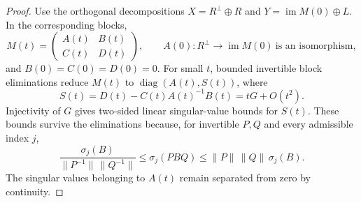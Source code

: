 \documentclass[11pt,a4paper]{article}
\theoremstyle{definition}
\theoremstyle{remark}
\newcommand{\im}{\operatorname{im}}
\newcommand{\diag}{\operatorname{diag}}
\begin{document}
\begin{proof}
Use the orthogonal decompositions $X=R^\perp\oplus R$ and
$Y=\im M(0)\oplus L$.  In the corresponding blocks,
\[
 M(t)=\begin{pmatrix}A(t)&B(t)\\ C(t)&D(t)\end{pmatrix},
 \qquad A(0):R^\perp\longrightarrow\im M(0)
 \ \text{is an isomorphism},
\]
and $B(0)=C(0)=D(0)=0$.  For small $t$, bounded invertible block eliminations reduce
$M(t)$ to $\diag(A(t),S(t))$, where
\[
 S(t)=D(t)-C(t)A(t)^{-1}B(t)=tG+O(t^2).
\]
Injectivity of $G$ gives two-sided linear singular-value bounds for $S(t)$.  These bounds
survive the eliminations because, for invertible $P,Q$ and every admissible index $j$,
\begin{equation}\label{eq:svelimination}
 \frac{\sigma_j(B)}{\|P^{-1}\|\,\|Q^{-1}\|}
 \leq\sigma_j(PBQ)
 \leq\|P\|\,\|Q\|\,\sigma_j(B).
\end{equation}
The singular values belonging to $A(t)$ remain separated from zero by continuity.
\end{proof}
\end{document}
